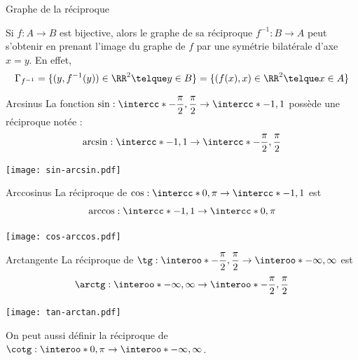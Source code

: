 \documentclass[french,xcolor=svgnames]{beamer}
\begin{document}
\begin{frame}{Graphe de la réciproque}

Si $f : A \to B$ est bijective, alors le graphe de sa réciproque $f^{-1} : B \to A$ peut s'obtenir en prenant l'image du graphe de $f$ par une symétrie bilatérale d'axe $x = y$. En effet,
\begin{equation*}
\Gamma_{f^{-1}} = \{(y,f^{-1}(y)) \in \RR^2 \telque y \in B\}
= \{(f(x),x) \in \RR^2 \telque x \in A\}
\end{equation*} 
\end{frame}
\begin{frame}{Arcsinus}
La fonction $\sin : \intercc*{-\dfrac{\pi}{2}, \dfrac{\pi}{2}} \to \intercc*{-1,1}$
possède une réciproque notée :
\begin{equation*}
\arcsin : \intercc*{-1,1} \to \intercc*{-\dfrac{\pi}{2},\dfrac{\pi}{2}}
\end{equation*}

\begin{center}
\texttt{[image: sin-arcsin.pdf]}
\end{center}

\end{frame}
\begin{frame}{Arccosinus}
La réciproque de $\cos : \intercc*{0,\pi} \to \intercc*{-1,1}$ est
\begin{equation*}
\arccos : \intercc*{-1,1} \to \intercc*{0,\pi}
\end{equation*}

\begin{center}
\texttt{[image: cos-arccos.pdf]}
\end{center}

\end{frame}
\begin{frame}{Arctangente}
La réciproque de $\tg : \interoo*{-\dfrac{\pi}{2}, \dfrac{\pi}{2}} \to \interoo*{-\infty,
\infty}$ est 
\begin{equation*}
\arctg : \interoo*{-\infty, \infty} \to \interoo*{-\dfrac{\pi}{2},\dfrac{\pi}{2}}
\end{equation*}

\begin{center}
\texttt{[image: tan-arctan.pdf]}
\end{center}

On peut aussi définir la réciproque de $\cotg : \interoo*{0,\pi} \to \interoo*{-\infty,\infty}$.
\end{frame}
\end{document}
